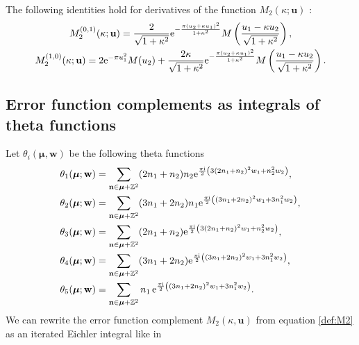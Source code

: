 \documentclass[10pt,a4paper]{amsart}
\def\BZ{\mathbb{Z}}
\def\bmu{\boldsymbol{\mu}}
\theoremstyle{definition}
\numberwithin{equation}{section}
\begin{document}
The following identities hold for derivatives of the function $M_2(\kappa ; \mathbf{u})$ \cite{Alexandrov:2016enp}:
\begin{gather*}%
M_2^{(0,1)}(\kappa ; \mathbf{u}) = \frac{2}{ \sqrt{1+\kappa^2} } {\rm e}^{- \frac{\pi (u_2+\kappa u_1)^2}{1+\kappa^2}}
M\left( \frac{u_1 - \kappa u_2}{\sqrt{1+\kappa^2}} \right),\\
M_2^{(1,0)}(\kappa ; \mathbf{u}) = 2 {\rm e}^{-\pi u_1^2} M(u_2) +
\frac{2\kappa}{\sqrt{1+\kappa^2}}
{\rm e}^{- \frac{\pi (u_2+\kappa u_1)^2}{1+\kappa^2}}
M\left( \frac{u_1 - \kappa u_2}{\sqrt{1+\kappa^2}} \right) .
\end{gather*}

\subsection*{Error function complements as integrals of theta functions}
Let $\theta_{i} ( \bmu,\mathbf{w} )$ be the following theta functions
\begin{align}
	\theta_1(\boldsymbol{\mu} ; \mathbf{w}) &= \sum_{\mathbf{n} \in \boldsymbol{\mu} + \BZ^2} (2n_1 + n_2) n_2 {\rm e}^{\frac{\pi {\rm i}}{2} \left( 3(2n_1 + n_2)^2 w_1 + n_2^2 w_2 \right)},\nonumber\\
	\theta_2(\boldsymbol{\mu} ; \mathbf{w}) &= \sum_{\mathbf{n} \in \boldsymbol{\mu} + \BZ^2} (3n_1 + 2n_2) n_1
	{\rm e}^{\frac{\pi {\rm i}}{2} \left( (3n_1 + 2n_2)^2 w_1 + 3n_1^2 w_2 \right)},\nonumber\\
	\theta_3 (\boldsymbol{\mu};\mathbf{w}) &= \sum_{\mathbf{n} \in \boldsymbol{\mu} + \BZ^2} (2n_1 + n_2)
	{\rm e}^{\frac{\pi {\rm i}}{2} \left( 3(2n_1 + n_2)^2 w_1 + n_2^2 w_2 \right)},\nonumber\\
	\theta_4 (\boldsymbol{\mu};\mathbf{w}) &= \sum_{\mathbf{n} \in \boldsymbol{\mu} + \BZ^2} (3n_1 + 2n_2)
	{\rm e}^{\frac{\pi {\rm i}}{2} \left( (3n_1 + 2n_2)^2 w_1 + 3n_1^2 w_2 \right)},\nonumber\\
	\theta_5 (\boldsymbol{\mu};\mathbf{w}) &= \sum_{\mathbf{n} \in \boldsymbol{\mu} + \BZ^2} n_1 \,
	{\rm e}^{\frac{\pi {\rm i}}{2} \left( (3n_1 + 2n_2)^2 w_1 + 3n_1^2 w_2 \right)} .\label{def:thetaellalw}
\end{align}
We can rewrite the error function complement $M_{2}\left( \kappa,\mathbf{u} \right)$ from equation \eqref{def:M2} as an iterated Eichler integral like in \cite{bringmann2018higher}
\end{document}
